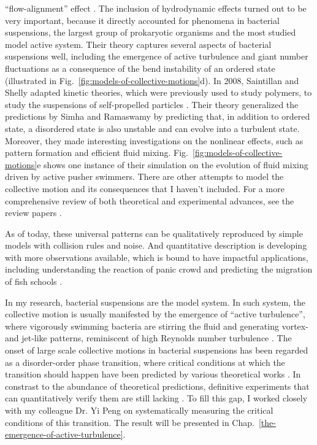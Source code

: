 ``flow-alignment'' effect \cite{Forster1974}. The inclusion of hydrodynamic effects turned out to be very important, because it directly accounted for phenomena in bacterial suspensions, the largest group of prokaryotic organisms and the most studied model active system. Their theory captures several aspects of bacterial suspensions well, including the emergence of active turbulence and giant number fluctuations as a consequence of the bend instability of an ordered state (illustrated in Fig.~\ref{fig:models-of-collective-motions}d). In 2008, Saintillan and Shelly adapted kinetic theories, which were previously used to study polymers, to study the suspensions of self-propelled particles \cite{Saintillan2008a, Saintillan2008b}. Their theory generalized the predictions by Simha and Ramaswamy by predicting that, in addition to ordered state, a disordered state is also unstable and can evolve into a turbulent state. Moreover, they made interesting investigations on the nonlinear effects, such as pattern formation and efficient fluid mixing. Fig.~\ref{fig:models-of-collective-motions}e shows one instance of their simulation on the evolution of fluid mixing driven by active pusher swimmers. There are other attempts to model the collective motion and its consequences that I haven't included. For a more comprehensive review of both theoretical and experimental advances, see the review papers
\cite{Ramaswamy2010, Koch2011, Marchetti2013}.

As of today, these universal patterns can be qualitatively reproduced by simple models with collision rules and noise. And quantitative description is developing with more observations available, which is bound to have impactful applications, including understanding the reaction of panic crowd and predicting the migration of fish schools
\cite{Vicsek2012}.

In my research, bacterial suspensions are the model system. In such system, the collective motion is usually manifested by the emergence of ``active turbulence'', where vigorously swimming bacteria are stirring the fluid and generating vortex- and jet-like patterns, reminiscent of high Reynolds number turbulence \cite{Dombrowski2004, Sokolov2007, Sokolov2009,
Sokolov2012, Ishikawa2011, Wensink2012, Dunkel2013, Peng2020}.
The onset of large scale collective motions in bacterial suspensions has been regarded as a disorder-order phase transition, where critical conditions at which the transition should happen have been predicted by various theoretical works \cite{Baskaran2009, Koch2011, Marchetti2013, Saintillan2015}.
In constrast to the abundance of theoretical predictions, definitive experiments that can quantitatively verify them are  still lacking \cite{Koch2011, Saintillan2015}.
To fill this gap, I worked closely with my colleague Dr. Yi Peng on systematically measuring the critical conditions of this transition. The result will be presented in Chap.~\ref{the-emergence-of-active-turbulence}.

